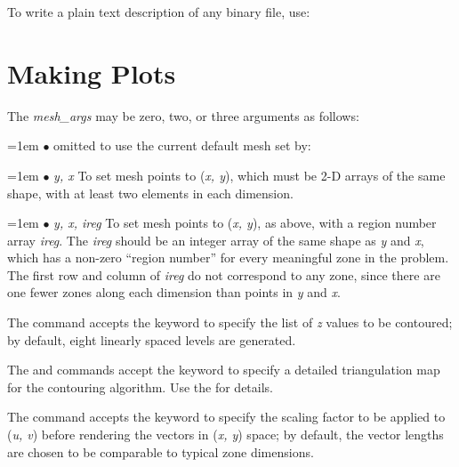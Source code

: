 To write a plain text description of any binary file, use:


\section{Making Plots}


The {\it mesh\_args\/} may be zero, two, or three arguments as follows:

\hangindent=1em
$\bullet$ omitted to use the current default mesh set by:


\hangindent=1em
$\bullet$ {\it y, x} \hfil\break
To set mesh points to ({\it x, y\/}), which must be 2-D arrays of the same
shape, with at least two elements in each dimension.

\hangindent=1em
$\bullet$ {\it y, x, ireg} \hfil\break
To set mesh points to ({\it x, y\/}), as above, with a region number array
{\it ireg}.  The {\it ireg\/} should be an integer array of the same
shape as {\it y\/} and {\it x}, which has a non-zero ``region number'' for
every meaningful zone in the problem.  The first row and column of
{\it ireg\/} do not correspond to any zone, since there are one fewer zones
along each dimension than points in {\it y\/} and {\it x}.

The  command accepts the  keyword to specify the list of
{\it z\/} values to be contoured; by default, eight linearly spaced levels
are generated.

The  and  commands accept the  keyword
to specify a detailed triangulation map for the contouring algorithm.  Use
the  for details.

The  command accepts the  keyword to specify the
scaling factor to be applied to ({\it u, v\/}) before rendering the vectors
in ({\it x, y\/}) space; by default, the vector lengths are chosen to be
comparable to typical zone dimensions.

